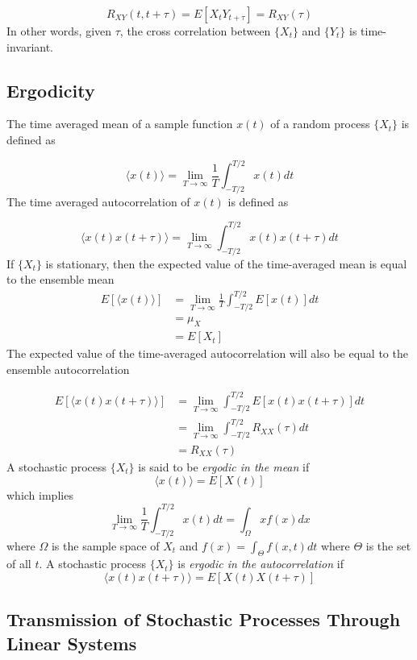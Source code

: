 \documentclass[]{article}
\begin{document}
\begin{equation} R_{XY}(t, t+\tau) = E[X_{t}Y_{t+\tau}] = R_{XY}(\tau) \end{equation}
In other words, given $\tau$, the cross correlation between $\{ X_{t} \}$ and $\{ Y_{t} \}$ is time-invariant.

\subsection{Ergodicity}
The time averaged mean of a sample function $x(t)$ of a random process $\{ X_{t} \}$ is defined as

\begin{equation} \langle x(t) \rangle =  \lim_{T\to\infty} \frac{1}{T} \int_{-T/2}^{T/2} x(t)dt \end{equation}
The time averaged autocorrelation of $x(t)$ is defined as

\begin{equation} \langle x(t)x(t+\tau) \rangle = \lim_{T\to\infty} \int_{-T/2}^{T/2} x(t)x(t+\tau)dt\end{equation}
If $\{ X_{t} \}$ is stationary, then the expected value of the time-averaged mean is equal to the ensemble mean
\begin{equation} \begin{split} E[\langle x(t) \rangle] & =  \lim_{T\to\infty} \frac{1}{T} \int_{-T/2}^{T/2} E[x(t)]dt \\
& = \mu_{X} \\
& = E[X_{t}]
\end{split} \end{equation}
The expected value of the time-averaged autocorrelation will also be equal to the ensemble autocorrelation

\begin{equation} \begin{split}
E[\langle x(t)x(t+\tau) \rangle] & = \lim_{T\to\infty} \int_{-T/2}^{T/2} E[x(t)x(t+\tau)]dt\\
& = \lim_{T\to\infty} \int_{-T/2}^{T/2} R_{XX}(\tau)dt \\
& = R_{XX}(\tau)
\end{split}
\end{equation}
A stochastic process $ \{ X_{t} \}$ is said to be \textit{ergodic in the mean} if 
\begin{equation}\langle x(t) \rangle = E[X(t)] \end{equation}
which implies
\begin{equation} \lim_{T\to\infty} \frac{1}{T} \int_{-T/2}^{T/2} x(t)dt = \int_{\Omega} xf(x)dx \end{equation}
where $\Omega$ is the sample space of $X_{t}$ and $f(x) = \int_{\Theta}f(x, t)dt$ where $\Theta$ is the set of all $t$.
\newline
\newline
\noindent
A stochastic process $ \{ X_{t} \}$ is \textit{ergodic in the autocorrelation} if
\begin{equation}\langle x(t)x(t+\tau) \rangle = E[X(t)X(t+\tau)] \end{equation}

\subsection{Transmission of Stochastic Processes Through Linear Systems}



\newpage

\end{document}
